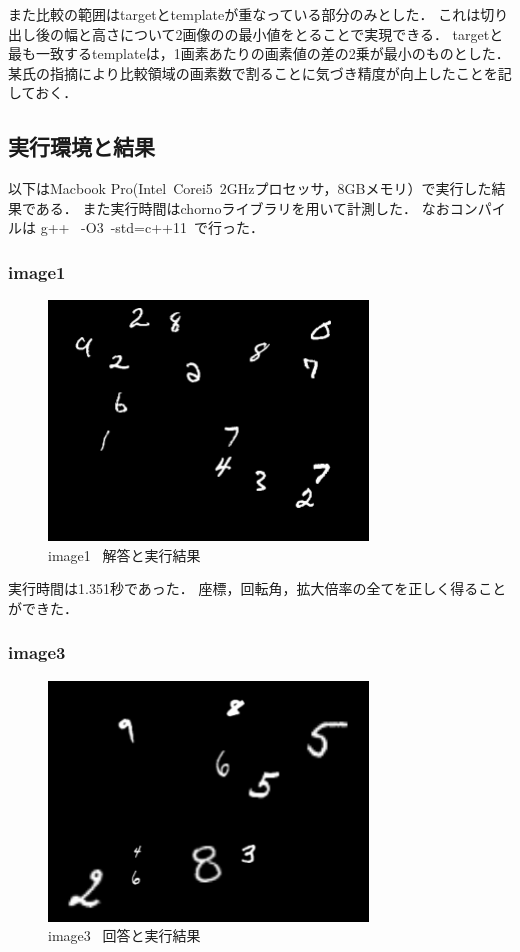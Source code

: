 \documentclass[uplatex,dvipdfmx]{jsarticle}
\begin{document}


また比較の範囲はtargetとtemplateが重なっている部分のみとした．
これは切り出し後の幅と高さについて2画像のの最小値をとることで実現できる．
targetと最も一致するtemplateは，1画素あたりの画素値の差の2乗が最小のものとした．
某氏の指摘により比較領域の画素数で割ることに気づき精度が向上したことを記しておく．


\subsection{実行環境と結果}
以下はMacbook Pro(Intel~Corei5~2GHzプロセッサ，8GBメモリ）で実行した結果である．
また実行時間はchornoライブラリを用いて計測した．
なおコンパイルは g++ ~-O3~-std=c++11~で行った．

\subsubsection{image1}
\begin{figure}[h]
\centering
\includegraphics[clip,width = 8.5cm]{images/image1.png}
\caption{image1~ 解答と実行結果}
\label{graph1}
\end{figure}


実行時間は1.351秒であった．
座標，回転角，拡大倍率の全てを正しく得ることができた．

\subsubsection{image3}
\begin{figure}[h]
\centering
\includegraphics[clip,width = 8.5cm]{images/image3.png}
\caption{image3~ 回答と実行結果}
\label{graph3}
\end{figure}
\end{document}
